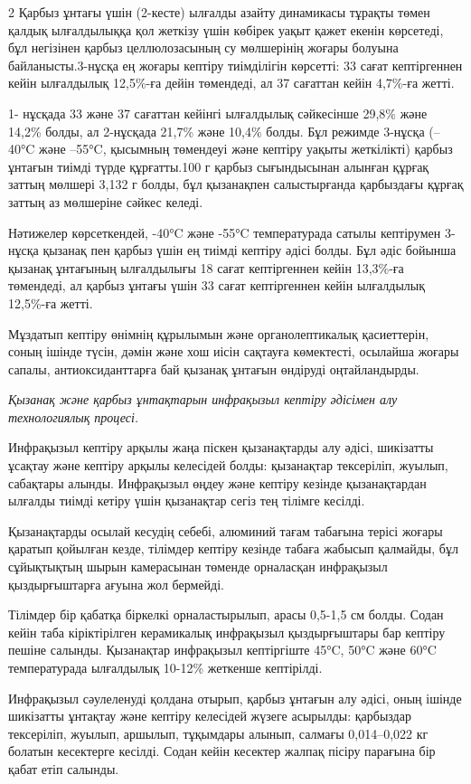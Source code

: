 \begin{multicols}{2}
Қарбыз ұнтағы үшін (2-кесте) ылғалды азайту динамикасы тұрақты төмен
қалдық ылғалдылыққа қол жеткізу үшін көбірек уақыт қажет екенін
көрсетеді, бұл негізінен қарбыз целлюлозасының су мөлшерінің жоғары
болуына байланысты.3-нұсқа ең жоғары кептіру тиімділігін көрсетті: 33
сағат кептіргеннен кейін ылғалдылық 12,5\%-ға дейін төмендеді, ал 37
сағаттан кейін 4,7\%-ға жетті.

1- нұсқада 33 және 37 сағаттан кейінгі ылғалдылық сәйкесінше 29,8\% және
14,2\% болды, ал 2-нұсқада 21,7\% және 10,4\% болды. Бұл режимде 3-нұсқа
(--40°C және --55°C, қысымның төмендеуі және кептіру уақыты жеткілікті)
қарбыз ұнтағын тиімді түрде құрғатты.100 г қарбыз сығындысынан алынған
құрғақ заттың мөлшері 3,132 г болды, бұл қызанақпен салыстырғанда
қарбыздағы құрғақ заттың аз мөлшеріне сәйкес келеді.

Нәтижелер көрсеткендей, -40°C және -55°C температурада сатылы кептірумен
3-нұсқа қызанақ пен қарбыз үшін ең тиімді кептіру әдісі болды. Бұл әдіс
бойынша қызанақ ұнтағының ылғалдылығы 18 сағат кептіргеннен кейін
13,3\%-ға төмендеді, ал қарбыз ұнтағы үшін 33 сағат кептіргеннен кейін
ылғалдылық 12,5\%-ға жетті.

Мұздатып кептіру өнімнің құрылымын және органолептикалық қасиеттерін,
соның ішінде түсін, дәмін және хош иісін сақтауға көмектесті, осылайша
жоғары сапалы, антиоксиданттарға бай қызанақ ұнтағын өндіруді
оңтайландырды.

\emph{Қызанақ және қарбыз ұнтақтарын инфрақызыл кептіру әдісімен алу
технологиялық процесі.}

Инфрақызыл кептіру арқылы жаңа піскен қызанақтарды алу әдісі, шикізатты
ұсақтау және кептіру арқылы келесідей болды: қызанақтар тексеріліп,
жуылып, сабақтары алынды. Инфрақызыл өңдеу және кептіру кезінде
қызанақтардан ылғалды тиімді кетіру үшін қызанақтар сегіз тең тілімге
кесілді.

Қызанақтарды осылай кесудің себебі, алюминий тағам табағына терісі
жоғары қаратып қойылған кезде, тілімдер кептіру кезінде табаға жабысып
қалмайды, бұл сұйықтықтың шырын камерасынан төменде орналасқан
инфрақызыл қыздырғыштарға ағуына жол бермейді.

Тілімдер бір қабатқа біркелкі орналастырылып, арасы 0,5-1,5 см болды.
Содан кейін таба кіріктірілген керамикалық инфрақызыл қыздырғыштары бар
кептіру пешіне салынды. Қызанақтар инфрақызыл кептіргіште 45°C, 50°C
және 60°C температурада ылғалдылық 10-12\% жеткенше кептірілді.

Инфрақызыл сәулеленуді қолдана отырып, қарбыз ұнтағын алу әдісі, оның
ішінде шикізатты ұнтақтау және кептіру келесідей жүзеге асырылды:
қарбыздар тексеріліп, жуылып, аршылып, тұқымдары алынып, салмағы
0,014--0,022 кг болатын кесектерге кесілді. Содан кейін кесектер жалпақ
пісіру парағына бір қабат етіп салынды.


\end{multicols}
